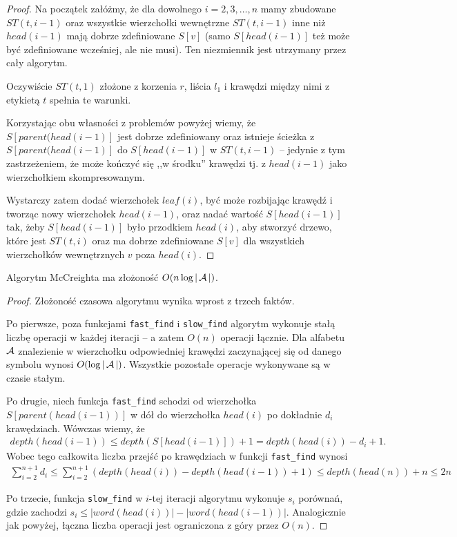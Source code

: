 \begin{proof}
  Na początek załóżmy, że dla dowolnego $i = 2, 3, \ldots, n$ mamy zbudowane $ST(t, i - 1)$ oraz wszystkie wierzchołki wewnętrzne $ST(t, i - 1)$ inne niż $head(i - 1)$ mają dobrze zdefiniowane $S[v]$ (samo $S[head(i - 1)]$ też może być zdefiniowane wcześniej, ale nie musi). Ten niezmiennik jest utrzymany przez cały algorytm.

  Oczywiście $ST(t, 1)$ złożone z korzenia $r$, liścia $l_1$ i krawędzi między nimi z etykietą $t$ spełnia te warunki.
  
  Korzystając obu własności z problemów powyżej wiemy, że $S[parent(head(i - 1)]$ jest dobrze zdefiniowany oraz istnieje ścieżka z $S[parent(head(i - 1)]$ do $S[head(i - 1)]$ w $ST(t, i - 1)$ -- jedynie z tym zastrzeżeniem, że może kończyć się ,,w środku'' krawędzi tj. z $head(i - 1)$ jako wierzchołkiem skompresowanym.
  
  Wystarczy zatem dodać wierzchołek $leaf(i)$, być może rozbijając krawędź i tworząc nowy wierzchołek $head(i - 1)$, oraz nadać wartość $S[head(i - 1)]$ tak, żeby $S[head(i - 1)]$ było przodkiem $head(i)$, aby stworzyć drzewo, które jest $ST(t, i)$ oraz ma dobrze zdefiniowane $S[v]$ dla wszystkich wierzchołków wewnętrznych $v$ poza $head(i)$.
\end{proof}

\begin{theorem}{}{}
  Algorytm McCreighta ma złożoność $O(n \log{|\operatorname{\mathcal{A}}|})$.
\end{theorem}

\begin{proof}
  Złożoność czasowa algorytmu wynika wprost z trzech faktów.
  
  Po pierwsze, poza funkcjami \texttt{fast\_find} i \texttt{slow\_find} algorytm wykonuje stałą liczbę operacji w każdej iteracji -- a zatem $O(n)$ operacji łącznie.
  Dla alfabetu $\operatorname{\mathcal{A}}$ znalezienie w wierzchołku odpowiedniej krawędzi zaczynającej się od danego symbolu wynosi $O(\log{|\operatorname{\mathcal{A}}|})$. Wszystkie pozostałe operacje wykonywane są w czasie stałym.

  Po drugie, niech funkcja \texttt{fast\_find} schodzi od wierzchołka $S[parent(head(i - 1))]$ w dół do wierzchołka $head(i)$ po dokładnie $d_i$ krawędziach. Wówczas wiemy, że
  \begin{align*}
    depth(head(i - 1)) \le depth(S[head(i - 1)]) + 1 = depth(head(i)) - d_i + 1.
  \end{align*}
  Wobec tego całkowita liczba przejść po krawędziach w funkcji \texttt{fast\_find} wynosi
  \begin{align*}
    \sum_{i = 2}^{n + 1} d_i \le \sum_{i = 2}^{n + 1} \left(depth(head(i)) - depth(head(i - 1)) + 1\right) \le depth(head(n)) + n \le 2 n
  \end{align*}

  Po trzecie, funkcja \texttt{slow\_find} w $i$-tej iteracji algorytmu wykonuje $s_i$ porównań, gdzie zachodzi $s_i \le |word(head(i))| - |word(head(i - 1))|$. Analogicznie jak powyżej, łączna liczba operacji jest ograniczona z góry przez $O(n)$.
\end{proof}


